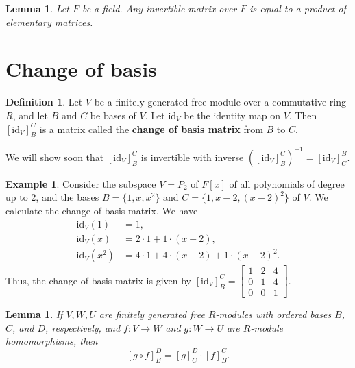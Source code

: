 \documentclass[12pt]{report}
\newtheorem{lemma}[theorem]{Lemma}
\numberwithin{equation}{section}
\numberwithin{theorem}{chapter}
\theoremstyle{definition}
\newtheorem{definition}[theorem]{Definition}
\newtheorem{example}[theorem]{Example}
\newtheorem*{basic properties}{Basic Properties}
\newtheorem*{Important Remark}{Important Remark}
\newcommand{\df}[1]{{\bf #1}\index{#1}}
\begin{document}
\begin{lemma} Let $F$ be a field. Any invertible matrix over $F$ is equal to a product of elementary matrices.
\end{lemma}



\section{Change of basis}
 

\begin{definition}
Let $V$ be a finitely generated free module over a commutative ring $R$, and let $B$ and $C$ be bases of $V$. Let $\mathrm{id}_V$ be the identity map on $V$. Then $[\mathrm{id}_V]_B^{C}$ is a matrix called the \df{change of basis matrix} from $B$ to $C$.
\end{definition}
 
We will show soon that $[\mathrm{id}_V]_B^{C}$ is invertible with inverse $\left([\mathrm{id}_V]_B^{C}\right)^{-1}=[\mathrm{id}_V]_{C}^B$.

\begin{example}
Consider the subspace $V = P_2$ of $F[x]$ of all polynomials of degree up to $2$, and the bases $B = \{1, x, x^2\}$ and $C = \{1,x-2,(x-2)^2\}$ of $V$. We calculate the change of basis matrix. We have
$$\begin{aligned}
\mathrm{id}_V(1) &=1 ,\\
\mathrm{id}_V(x) &=2\cdot1+1\cdot(x-2), \\
\mathrm{id}_V(x^2) &=4\cdot1 +4\cdot(x-2)+1\cdot(x-2)^2.
\end{aligned}$$
Thus, the change of basis matrix is given by 
$[\mathrm{id}_V]_B^{C} = \begin{bmatrix}
1 & 2 & 4\\
0 & 1 & 4\\
0 & 0 & 1
\end{bmatrix}.$
\end{example}




 
\begin{lemma}\label{lem:matcompos}
 If $V,W,U$ are finitely generated free $R$-modules with ordered bases $B$, $C$, and $D$, respectively, and $f\!: V \to W$ and $g\!: W \to U$ are $R$-module homomorphisms, then 
 $$[g\circ f]_B^D=[g]_C^D \cdot [f]_B^C.$$
\end{lemma}
 
\end{document}
